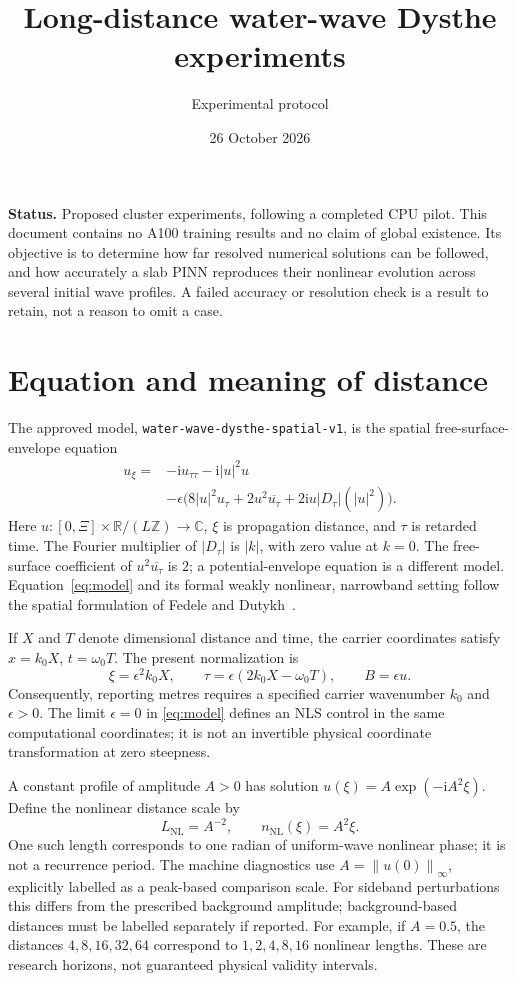 \documentclass[11pt]{article}
\title{Long-distance water-wave Dysthe experiments}
\author{Experimental protocol}
\date{26 October 2026}
\newcommand{\norm}[1]{\left\lVert #1\right\rVert}
\newcommand{\Dabs}{\lvert D_\tau\rvert}
\begin{document}
\maketitle

\noindent\textbf{Status.} Proposed cluster experiments, following a completed CPU
pilot. This document contains no A100 training results and no claim of global
existence. Its objective is to determine how far resolved numerical solutions
can be followed, and how accurately a slab PINN reproduces their nonlinear
evolution across several initial wave profiles. A failed accuracy or resolution
check is a result to retain, not a reason to omit a case.

\section{Equation and meaning of distance}

The approved model, \texttt{water-wave-dysthe-spatial-v1}, is the spatial
free-surface-envelope equation
\begin{equation}\label{eq:model}
\begin{split}
u_\xi={}&-\mathrm{i}u_{\tau\tau}-\mathrm{i}|u|^2u\\
&-\epsilon\bigl(8|u|^2u_\tau+2u^2\overline{u_\tau}
                  +2\mathrm{i}u\Dabs(|u|^2)\bigr).
\end{split}
\end{equation}
Here \(u\colon[0,\Xi]\times\mathbb R/(L\mathbb Z)\to\mathbb C\),
\(\xi\) is propagation distance, and \(\tau\) is retarded time. The Fourier
multiplier of \(\Dabs\) is \(|k|\), with zero value at \(k=0\).
The free-surface coefficient of \(u^2\overline{u_\tau}\) is \(2\); a
potential-envelope equation is a different model. Equation~\eqref{eq:model}
and its formal weakly nonlinear, narrowband setting follow the spatial
formulation of Fedele and Dutykh~\cite{fedele}.

If \(X\) and \(T\) denote dimensional distance and time, the carrier
coordinates satisfy \(x=k_0X\), \(t=\omega_0T\). The present normalization is
\[
\xi=\epsilon^2k_0X,\qquad
\tau=\epsilon(2k_0X-\omega_0T),\qquad B=\epsilon u.
\]
Consequently, reporting metres requires a specified carrier wavenumber
\(k_0\) and \(\epsilon>0\). The limit \(\epsilon=0\) in
\eqref{eq:model} defines an NLS control in the same computational coordinates;
it is not an invertible physical coordinate transformation at zero steepness.

A constant profile of amplitude \(A>0\) has solution
\(u(\xi)=A\exp(-\mathrm{i}A^2\xi)\). Define the nonlinear distance scale by
\[
L_{\mathrm{NL}}=A^{-2},\qquad n_{\mathrm{NL}}(\xi)=A^2\xi.
\]
One such length corresponds to one radian of uniform-wave nonlinear phase;
it is not a recurrence period. The machine diagnostics use
\(A=\norm{u(0)}_\infty\), explicitly labelled as a peak-based comparison scale.
For sideband perturbations this differs from the prescribed background
amplitude; background-based distances must be labelled separately if reported.
For example, if \(A=0.5\), the distances \(4,8,16,32,64\) correspond to
\(1,2,4,8,16\) nonlinear lengths. These are research horizons, not guaranteed
physical validity intervals.
\end{document}

